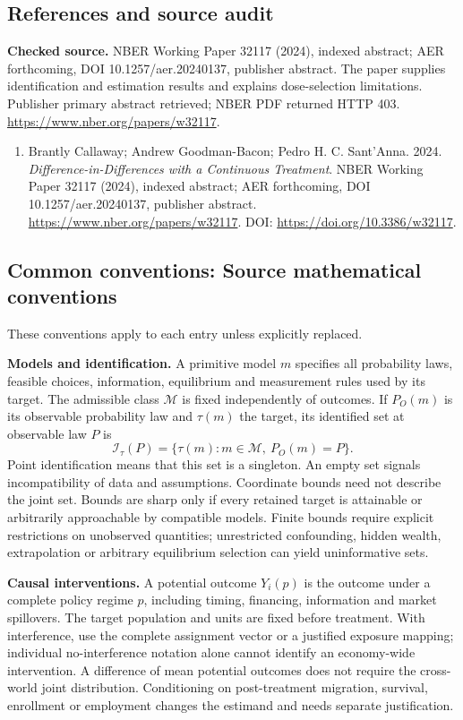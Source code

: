\documentclass[11pt,a4paper]{article}
\begin{document}
\subsection*{References and source audit}
\textbf{Checked source.} NBER Working Paper 32117 (2024), indexed abstract; AER forthcoming, DOI 10.1257/aer.20240137, publisher abstract. The paper supplies identification and estimation results and explains dose-selection limitations. Publisher primary abstract retrieved; NBER PDF returned HTTP 403. \url{https://www.nber.org/papers/w32117}.
\begin{enumerate}\raggedright
\item\hypertarget{definitions:source:30007705:1}{} Brantly Callaway; Andrew Goodman-Bacon; Pedro H. C. Sant'Anna. 2024. \emph{Difference-in-Differences with a Continuous Treatment}. NBER Working Paper 32117 (2024), indexed abstract; AER forthcoming, DOI 10.1257/aer.20240137, publisher abstract.
\url{https://www.nber.org/papers/w32117}.
DOI: \url{https://doi.org/10.3386/w32117}.
\end{enumerate}

\subsection*{Common conventions: Source mathematical conventions}

These conventions apply to each entry unless explicitly replaced.

\textbf{Models and identification.} A primitive model \(m\) specifies all probability laws, feasible choices, information, equilibrium and measurement rules used by its target. The admissible class \(\mathcal M\) is fixed independently of outcomes. If \(P_O(m)\) is its observable probability law and \(\tau(m)\) the target, its identified set at observable law \(P\) is
\[
 \mathcal I_\tau(P)=\{\tau(m):m\in\mathcal M,\ P_O(m)=P\}.
\]
Point identification means that this set is a singleton. An empty set signals incompatibility of data and assumptions. Coordinate bounds need not describe the joint set. Bounds are sharp only if every retained target is attainable or arbitrarily approachable by compatible models. Finite bounds require explicit restrictions on unobserved quantities; unrestricted confounding, hidden wealth, extrapolation or arbitrary equilibrium selection can yield uninformative sets.

\textbf{Causal interventions.} A potential outcome \(Y_i(p)\) is the outcome under a complete policy regime \(p\), including timing, financing, information and market spillovers. The target population and units are fixed before treatment. With interference, use the complete assignment vector or a justified exposure mapping; individual no-interference notation alone cannot identify an economy-wide intervention. A difference of mean potential outcomes does not require the cross-world joint distribution. Conditioning on post-treatment migration, survival, enrollment or employment changes the estimand and needs separate justification.
\end{document}
